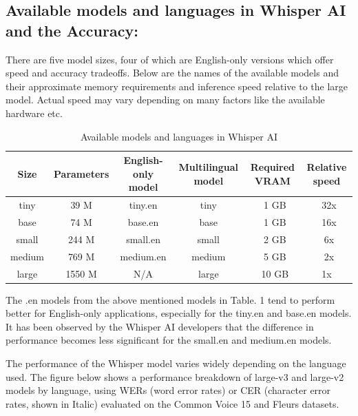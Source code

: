 \documentclass[12px, a4paper]{article}
\begin{document}
\subsection{Available models and languages in Whisper AI and the Accuracy:}
There are five model sizes, four of which are English-only versions which offer speed and accuracy tradeoffs. Below are the names of the available models and their approximate memory requirements and inference speed relative to the large model. Actual speed may vary depending on many factors like the available hardware etc.

\begin{table}[!h]
    \centering
    \begin{tabular}{|c|c|c|c|c|c|}
        \hline
        \textbf{Size} & \textbf{Parameters} & \textbf{English-only model} & \textbf{Multilingual model} & \textbf{Required VRAM} & \textbf{Relative speed}\\
        \hline
        tiny & 39 M & tiny.en & tiny & ~1 GB & ~32x\\
        \hline
        base & 74 M & base.en & base & ~1 GB & ~16x\\
        \hline
        small & 244 M & small.en & small & ~2 GB & ~6x\\
        \hline
        medium & 769 M & medium.en & medium & ~5 GB & ~2x\\
        \hline
        large & 1550 M & N/A & large & ~10 GB & 1x\\
        \hline

    \end{tabular}
    \caption{Available models and languages in Whisper AI}
\end{table}


The .en models from the above mentioned models in Table. 1 tend to perform better for English-only applications, especially for the tiny.en and base.en models. It has been observed by the Whisper AI developers that the difference in performance becomes less significant for the small.en and medium.en models.

The performance of the Whisper model varies widely depending on the language used. The figure below shows a performance breakdown of large-v3 and large-v2 models by language, using WERs (word error rates) or CER (character error rates, shown in Italic) evaluated on the Common Voice 15 and Fleurs datasets. 
\end{document}
